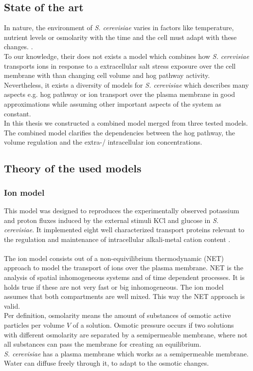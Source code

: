 \subsection{State of the art}

In nature, the environment of \emph{S. cerevisiae} varies in factors like temperature, nutrient levels or osmolarity with the time and the cell must adapt with these changes.  \cite{JannisUhlendorf}. \\To our knowledge, their does not exists a model which combines how \emph{S. cerevisiae} transports ions in response to a extracellular salt stress exposure over the cell membrane with than changing cell volume and hog pathway activity. \\
Nevertheless, it exists a diversity of models for \emph{S. cerevisiae} which describes many aspects e.g. hog pathway or ion transport over the plasma membrane in good approximations while assuming other important aspects of the system as constant. \\
In this thesis we constructed a combined model merged from three tested models. The combined model clarifies the dependencies between the hog pathway, the volume regulation and the extra-/ intracellular ion concentrations.

\subsection{Theory of the used models}
\subsubsection{Ion model}
This model was designed to reproduces the experimentally observed potassium and proton fluxes induced by the external stimuli KCl and glucose in \emph{S. cerevisiae}. It implemented eight well characterized transport proteins relevant to the regulation and maintenance of intracellular alkali-metal cation content \cite{Gerber_2016}. \\\\
The ion model consists out of a non-equivilibrium thermodynamic (NET) approach to model the transport of ions over the plasma membrane. NET is the analysis of spatial inhomogeneous systems and of time dependent processes. It is holds true if these are not very fast or big inhomogeneous. The ion model assumes that both compartments are well mixed. This way the NET approach is valid.\\

Per definition, osmolarity means the amount of substances of osmotic active particles per volume $V$ of a solution. Osmotic pressure occurs if two solutions with different osmolarity are separated by a semipermeable membrane, where not all substances can pass the membrane for creating an equilibrium.\\
\emph{S. cerevisiae} has a plasma membrane which works as a semipermeable membrane. Water can diffuse freely through it, to adapt to the osmotic changes. \\\\


